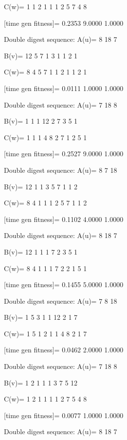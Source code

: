 C(w)=
     1     1     2     1     1     1     2     5     7     4     8

[time gen fitness]=
    0.2353    9.0000    1.0000

Double digest sequence:
A(u)=
     8    18     7

B(v)=
    12     5     7     1     3     1     1     2     1

C(w)=
     8     4     5     7     1     1     2     1     1     2     1

[time gen fitness]=
    0.0111    1.0000    1.0000

Double digest sequence:
A(u)=
     7    18     8

B(v)=
     1     1     1    12     2     7     3     5     1

C(w)=
     1     1     1     4     8     2     7     1     2     5     1

[time gen fitness]=
    0.2527    9.0000    1.0000

Double digest sequence:
A(u)=
     8     7    18

B(v)=
    12     1     1     3     5     7     1     1     2

C(w)=
     8     4     1     1     1     2     5     7     1     1     2

[time gen fitness]=
    0.1102    4.0000    1.0000

Double digest sequence:
A(u)=
     8    18     7

B(v)=
    12     1     1     1     7     2     3     5     1

C(w)=
     8     4     1     1     1     7     2     2     1     5     1

[time gen fitness]=
    0.1455    5.0000    1.0000

Double digest sequence:
A(u)=
     7     8    18

B(v)=
     1     5     3     1     1    12     2     1     7

C(w)=
     1     5     1     2     1     1     4     8     2     1     7

[time gen fitness]=
    0.0462    2.0000    1.0000

Double digest sequence:
A(u)=
     7    18     8

B(v)=
     1     2     1     1     1     3     7     5    12

C(w)=
     1     2     1     1     1     1     2     7     5     4     8

[time gen fitness]=
    0.0077    1.0000    1.0000

Double digest sequence:
A(u)=
     8    18     7

